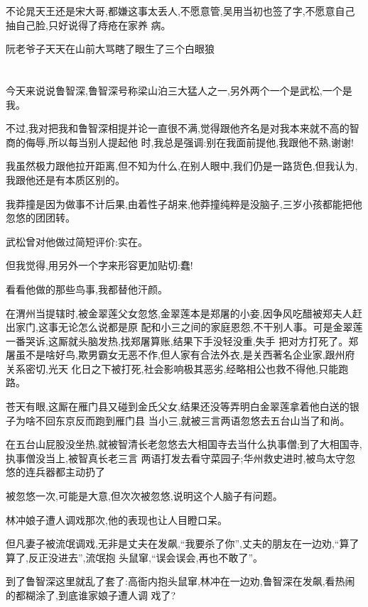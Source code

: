 ﻿\documentclass[12pt]{article}
\begin{document}
不论晁天王还是宋大哥,都嫌这事太丢人,不愿意管,吴用当初也签了字,不愿意自己抽自己脸,只好说得了痔疮在家养
病。

阮老爷子天天在山前大骂瞎了眼生了三个白眼狼\dldots
\section{}

今天来说说鲁智深,鲁智深号称梁山泊三大猛人之一,另外两个一个是武松,一个是我。

不过,我对把我和鲁智深相提并论一直很不满,觉得跟他齐名是对我本来就不高的智商的侮辱,所以每当别人提起他
时,我总是强调:别在我面前提他,我跟他不熟,谢谢!

我虽然极力跟他拉开距离,但不知为什么,在别人眼中,我们仍是一路货色,但我认为,我跟他还是有本质区别的。

我莽撞是因为做事不计后果,由着性子胡来,他莽撞纯粹是没脑子,三岁小孩都能把他忽悠的团团转。

武松曾对他做过简短评价:实在。

但我觉得,用另外一个字来形容更加贴切:蠢!

看看他做的那些鸟事,我都替他汗颜。

在渭州当提辖时,被金翠莲父女忽悠,金翠莲本是郑屠的小妾,因争风吃醋被郑夫人赶出家门,这事无论怎么说都是原
配和小三之间的家庭恩怨,不干别人事。可是金翠莲一番哭诉,这厮就头脑发热,找郑屠算账,结果下手没轻没重,失手
把对方打死了。郑屠虽不是啥好鸟,欺男霸女无恶不作,但人家有合法外衣,是关西著名企业家,跟州府关系密切,光天
化日之下被打死,社会影响极其恶劣,经略相公也救不得他,只能跑路。

苍天有眼,这厮在雁门县又碰到金氏父女,结果还没等弄明白金翠莲拿着他白送的银子为啥不回东京反而跑到雁门县
当小三,就被三言两语忽悠去五台山当了和尚。

在五台山屁股没坐热,就被智清长老忽悠去大相国寺去当什么执事僧;到了大相国寺,执事僧没当上,被智真长老三言
两语打发去看守菜园子;华州救史进时,被鸟太守忽悠的连兵器都主动扔了\dldots

被忽悠一次,可能是大意,但次次被忽悠,说明这个人脑子有问题。

林冲娘子遭人调戏那次,他的表现也让人目瞪口呆。

但凡妻子被流氓调戏,无非是丈夫在发飙,``我要杀了你'',丈夫的朋友在一边劝,``算了算了,反正没进去'',流氓抱
头鼠窜,``误会误会,再也不敢了''。

到了鲁智深这里就乱了套了:高衙内抱头鼠窜,林冲在一边劝,鲁智深在发飙,看热闹的都糊涂了,到底谁家娘子遭人调
戏了? 
\section{}
\end{document}
